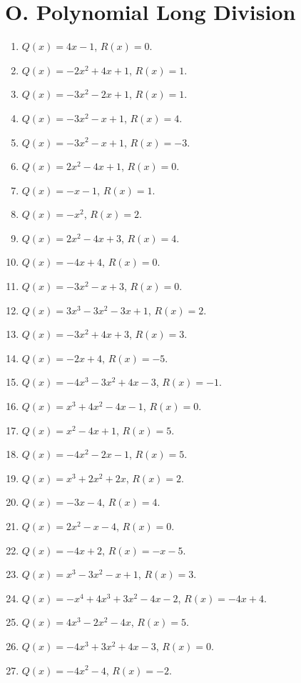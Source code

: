 \documentclass[11pt,oneside]{book}
\begin{document}
\section*{O. Polynomial Long Division}
\begin{enumerate}[leftmargin=*,label=\textbf{O\arabic*.},itemsep=0.45\baselineskip]
\item $Q(x)=4 x - 1$, $R(x)=0$.
\item $Q(x)=- 2 x^{2} + 4 x + 1$, $R(x)=1$.
\item $Q(x)=- 3 x^{2} - 2 x + 1$, $R(x)=1$.
\item $Q(x)=- 3 x^{2} - x + 1$, $R(x)=4$.
\item $Q(x)=- 3 x^{2} - x + 1$, $R(x)=-3$.
\item $Q(x)=2 x^{2} - 4 x + 1$, $R(x)=0$.
\item $Q(x)=- x - 1$, $R(x)=1$.
\item $Q(x)=- x^{2}$, $R(x)=2$.
\item $Q(x)=2 x^{2} - 4 x + 3$, $R(x)=4$.
\item $Q(x)=- 4 x + 4$, $R(x)=0$.
\item $Q(x)=- 3 x^{2} - x + 3$, $R(x)=0$.
\item $Q(x)=3 x^{3} - 3 x^{2} - 3 x + 1$, $R(x)=2$.
\item $Q(x)=- 3 x^{2} + 4 x + 3$, $R(x)=3$.
\item $Q(x)=- 2 x + 4$, $R(x)=-5$.
\item $Q(x)=- 4 x^{3} - 3 x^{2} + 4 x - 3$, $R(x)=-1$.
\item $Q(x)=x^{3} + 4 x^{2} - 4 x - 1$, $R(x)=0$.
\item $Q(x)=x^{2} - 4 x + 1$, $R(x)=5$.
\item $Q(x)=- 4 x^{2} - 2 x - 1$, $R(x)=5$.
\item $Q(x)=x^{3} + 2 x^{2} + 2 x$, $R(x)=2$.
\item $Q(x)=- 3 x - 4$, $R(x)=4$.
\item $Q(x)=2 x^{2} - x - 4$, $R(x)=0$.
\item $Q(x)=- 4 x + 2$, $R(x)=- x - 5$.
\item $Q(x)=x^{3} - 3 x^{2} - x + 1$, $R(x)=3$.
\item $Q(x)=- x^{4} + 4 x^{3} + 3 x^{2} - 4 x - 2$, $R(x)=- 4 x + 4$.
\item $Q(x)=4 x^{3} - 2 x^{2} - 4 x$, $R(x)=5$.
\item $Q(x)=- 4 x^{3} + 3 x^{2} + 4 x - 3$, $R(x)=0$.
\item $Q(x)=- 4 x^{2} - 4$, $R(x)=-2$.

\end{enumerate}
\end{document}
